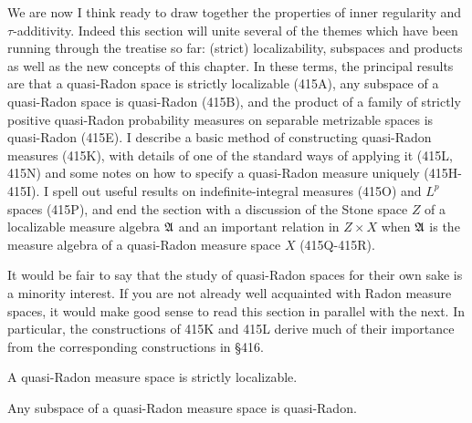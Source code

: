 
\def\chaptername{Topologies and measures I}
\def\sectionname{Quasi-Radon measure spaces}
\def\undphi{\underline{\phi}}


We are now I think ready to draw together the properties of inner
regularity and $\tau$-additivity.   Indeed this section will unite
several of the
themes which have been running through the treatise so far:  (strict)
localizability, subspaces and products as well as the new concepts of
this chapter.   In
these terms, the principal results are that a quasi-Radon space is
strictly localizable (415A), any subspace of a quasi-Radon space is
quasi-Radon (415B), and the product of a family of strictly positive
quasi-Radon probability measures on separable metrizable spaces is
quasi-Radon (415E).
I describe a basic method of constructing quasi-Radon measures
(415K), with details of one of the standard ways of applying it (415L,
415N) and some notes on how to specify a quasi-Radon measure uniquely
(415H-415I).   I spell out useful results on
indefinite-integral measures (415O) and $L^p$ spaces (415P), and end the
section with a discussion of the Stone space $Z$ of a localizable
measure algebra $\frak A$ and an important relation in
$Z\times X$ when $\frak A$ is the measure algebra of a quasi-Radon
measure space $X$ (415Q-415R).

It would be fair to say that the study of quasi-Radon spaces for their
own sake is a minority interest.   If you are not already well
acquainted
with Radon measure spaces, it would make good sense to read this section
in parallel with the next.   In particular, the constructions of 415K
and 415L derive much of their importance from the corresponding
constructions in \S416.

 A quasi-Radon measure space is strictly
localizable.


 Any subspace of a quasi-Radon measure space is
quasi-Radon.


